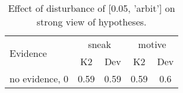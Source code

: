 \begin{table}\begin{tabular}{l|cc|cc}\toprule\multirow{2}{*}{Evidence} & \multicolumn{2}{c}{sneak}& \multicolumn{2}{c}{motive}\\& {K2} & {Dev}& {K2} & {Dev}\\\midrule
no evidence, 0 & 0.59&0.59&0.59&0.6\\\bottomrule\end{tabular}\caption{Effect of disturbance of [0.05, 'arbit'] on strong view of hypotheses.}\end{table}
